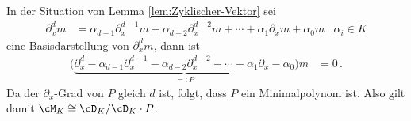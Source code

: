 \begin{prop} \label{prop:Zyklischer-Vektor}
In der Situation von Lemma \ref{lem:Zyklischer-Vektor} sei
\begin{align*}
\partial_x^d m&= \alpha_{d-1}\partial_x^{d-1}m + \alpha_{d-2}\partial_x^{d-2}m
  + \cdots + \alpha_1\partial_xm + \alpha_0m & \alpha_i\in K
\end{align*}
eine Basisdarstellung von $\partial_x^dm$, dann ist
\begin{align*}
\Big( \underset{=:P}{\underbrace{
  \partial_x^d-\alpha_{d-1}\partial_x^{d-1}-\alpha_{d-2}\partial_x^{d-2}
  - \cdots - \alpha_1\partial_x - \alpha_0 }} \Big)m&=0 \,.
\end{align*}
Da der $\partial_x$-Grad von $P$ gleich $d$ ist, folgt, dass $P$ ein
Minimalpolynom ist. Also gilt damit $\cM_K\cong\cD_K/\cD_K\cdot P$.
\end{prop}
\begin{comment}
\begin{prop}
In der Situation von Lemma \ref{lem:Zyklischer-Vektor} gibt es ein $P\in
\cD_K$ mit $\partial$-Grad von $P$ ist gleich $d$ und $P \cdot m=0$, in
diesem Fall ist $P$ ein Minimalpolynom zu $\cM_K$, also gilt
$\cM_K\cong\cD_K/\cD_K\cdot P$. 
\end{prop}
\begin{proof}
Explizit ergibt sich aus der Basisdarstellung
\begin{align*}
\partial_x^d m&= \alpha_{d-1}\partial_x^{d-1}m + \alpha_{d-2}\partial_x^{d-2}m
  + \cdots + \alpha_1\partial_xm + \alpha_0m & \alpha_i\in K
\end{align*}
von $\partial_x^d m$, dass
\[
\cM_K\cong\cD_K/\cD_K\cdot( \underset{=:Q}{\underbrace{
  \partial^d - \alpha_{d-1}\partial_x^{d-1} - \alpha_{d-2}\partial_x^{d-2} -
  \cdots - \alpha_1\partial_x - \alpha_0 }} )
\]
gilt und damit $P:=Q$ so ein Minimalpolynom ist.
\end{proof}
\end{comment}

